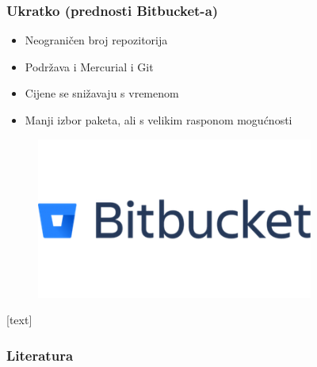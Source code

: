 \documentclass[12p, Times New Roman]{beamer}
\begin{document}
	\begin{frame}				%
		\frametitle{Ukratko (prednosti Bitbucket-a)}
		\begin{itemize}
			\item Neograničen broj repozitorija
			\item Podržava i Mercurial i Git
			\item Cijene se snižavaju s vremenom
			\item Manji izbor paketa, ali s velikim rasponom mogućnosti

		\end{itemize}

		\begin{figure}
			\begin{center}
				\includegraphics[scale=0.5]{logob.png}
			\end{center}
		\end{figure}


	\end{frame}

	\begin{frame}
	[text]
	\frametitle{Literatura}
		\nocite{*}
		
		

	\end{frame}
\end{document}
